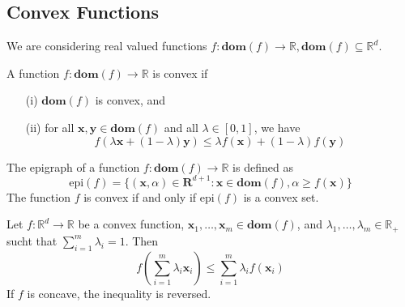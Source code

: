 \subsection{Convex Functions}
    We are considering real valued functions $f: \mathbf{dom}(f) \rightarrow \mathbb{R}, \mathbf{dom}(f) \subseteq \mathbb{R}^d$.

        A function $f: \mathbf{dom}(f) \rightarrow \mathbb{R}$ is convex if
        \begin{enumerate}
            \item[(i)] $\mathbf{dom}(f)$ is convex, and
            \item[(ii)] for all $\mathbf{x}, \mathbf{y} \in \mathbf{dom}(f)$ and all $\lambda \in [0, 1]$, we have
            $$f(\lambda \mathbf{x} + (1 - \lambda)\mathbf{y}) \leq \lambda f(\mathbf{x}) + (1 - \lambda) f(\mathbf{y})$$
        \end{enumerate}
        

        The epigraph of a function $f: \mathbf{dom}(f) \rightarrow \mathbb{R}$ is defined as
        \begin{equation*}
            \text{epi}(f) = \{(\mathbf{x}, \alpha) \in \mathbf{R}^{d+1} : \mathbf{x} \in \mathbf{dom}(f), \alpha \geq f(\mathbf{x}) \}
        \end{equation*}
        The function $f$ is convex if and only if $\text{epi}(f)$ is a convex set.

    
        Let $f: \mathbb{R}^d \rightarrow \mathbb{R}$ be a convex function, $\mathbf{x}_1,\dots,\mathbf{x}_m \in \mathbf{dom}(f)$,
        and $\lambda_1, \dots, \lambda_m \in \mathbb{R}_+$ sucht that $\sum_{i=1}^{m}\lambda_i = 1$.
        Then
        $$f\left(\sum_{i=1}^m \lambda_i \mathbf{x}_i\right) \leq \sum_{i=1}^m \lambda_i f(\mathbf{x}_i)$$
        If $f$ is concave, the inequality is reversed.
    
    
    

    